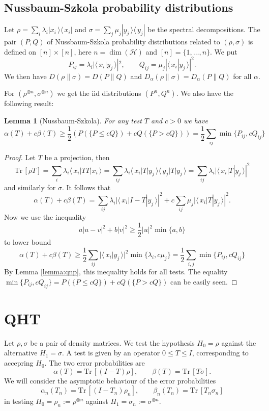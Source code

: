 \documentclass[12pt]{article}
\newtheorem{lemma}{Lemma}
\theoremstyle{definition}
\theoremstyle{remark}
\def\Ha{\mathcal H}
\def \Tr{\mathrm{Tr}\,}
\def\<{\langle\,}
\def\>{\,\rangle}
\begin{document}
\subsection{Nussbaum-Szkola probability distributions}

Let $\rho=\sum_i \lambda_i|x_i\>\<x_i|$ and $\sigma=\sum_j\mu_j|y_j\>\<y_j|$ be the
spectral decompositions. The pair $(P,Q)$ of Nussbaum-Szkola probability distributions
related to $(\rho,\sigma)$ is defined on $[n]\times [n]$, here $n=\dim(\Ha)$ and
$[n]=\{1,\dots,n\}$. We put
\[
P_{ij}=\lambda_i|\<x_i|y_j\>|^2,\qquad Q_{ij}=\mu_j|\<x_i|y_j\>|^2.
\]
We then have $D(\rho\|\sigma)=D(P\|Q)$ and $D_\alpha(\rho\|\sigma)=D_\alpha(P\|Q)$ for all
$\alpha$. 

For $(\rho^{\otimes n},\sigma^{\otimes n})$ we get the iid distributions $(P^n,Q^n)$. We also have the following result:

\begin{lemma}[Nussbaum-Szkola]\label{lemma:NS}
For any test $T$ and $c>0$  we have
\[
\alpha(T)+c\beta(T)\ge \frac12 (P(\{P\le
cQ\})+cQ(\{P>cQ\}))=\frac12\sum_{ij}\min\{P_{ij},cQ_{ij}\}
\]
\end{lemma}

\begin{proof}
Let $T$ be a projection, then
\[
\Tr[\rho T]=\sum_i\lambda_i\<x_i|TT|x_i\>=\sum_{ij}\lambda_i\<x_i|T|y_j\>\<y_j|T|y_j\>=\sum_{ij}\lambda_i
|\<x_i|T|y_j\>|^2
\]
and similarly for $\sigma$. 
It follows that 
\[
\alpha(T)+c\beta(T)=\sum_{ij}\lambda_i|\<x_i|I-T|y_j\>|^2+c\sum_{ij}\mu_j|\<x_i|T|y_j\>|^2.
\]
Now we use the inequality
\[
a|u-v|^2+b|v|^2\ge \frac12|u|^2\min\{a,b\}
\]
to lower bound
\[
\alpha(T)+c\beta(T)\ge \frac12
\sum_{ij}|\<x_i|y_j\>|^2\min\{\lambda_i,c\mu_j\}=\frac12\sum_{i,j}\min\{P_{ij},cQ_{ij}\}
\]
By Lemma \ref{lemma:qnp}, this inequality holds for all tests. The  equality 
$\min\{P_{ij},cQ_{ij}\}=P(\{P\le cQ\})+cQ(\{P>cQ\})$
can be easily seen.

\end{proof}




\section{QHT}


Let $\rho,\sigma$ be a pair of density matrices. We test the hypothesis $H_0=\rho$ against
the alternative $H_1=\sigma$. A test is given by an operator $0\le T\le I$, corresponding
to accepring $H_0$. The two error probabilities are
\[
\alpha(T)=\Tr[(I-T)\rho],\qquad \beta(T)=\Tr[T\sigma].
\]
We will consider the asymptotic behaviour of the error probabilities 
\[
\alpha_n(T_n)=\Tr[(I-T_n)\rho_n],\qquad \beta_n(T_n)=\Tr[T_n\sigma_n]
\]
in testing $H_0=\rho_n:=\rho^{\otimes n}$ against $H_1=\sigma_n:=\sigma^{\otimes n}$. 
\end{document}
